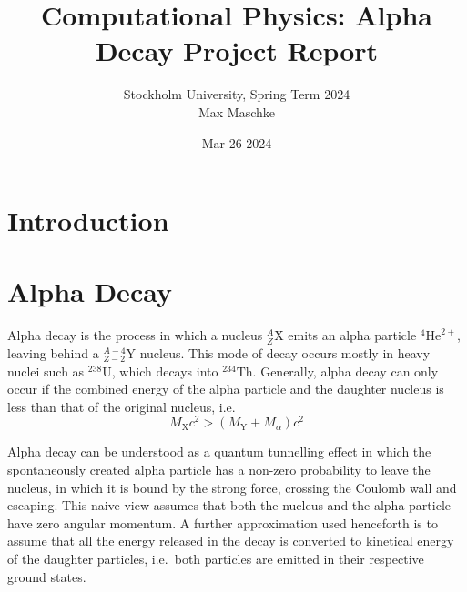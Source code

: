 \documentclass[a4paper,DIV=12,english]{scrartcl}
\title{Computational Physics: Alpha Decay Project Report}
\author{Stockholm University, Spring Term 2024 \\Max Maschke}
\date{Mar 26 2024}
\begin{document}
\maketitle


\tableofcontents
\newpage


\newpage
\section{Introduction}

\section{Alpha Decay}
Alpha decay is the process in which a nucleus $^A_Z \text{X}$ emits an alpha particle $^4\text{He}^{2+}$, leaving behind a $^{A-4}_{Z-2}\text{Y}$ nucleus. This mode of decay occurs mostly in heavy nuclei such as $^{238} \text{U}$, which decays into $^{234}\text{Th}$. Generally, alpha decay can only occur if the combined energy of the alpha particle and the daughter nucleus is less than that of the original nucleus, i.e.
\begin{equation}
    M_\text{X} c^2 > (M_\text{Y} + M_\alpha)c^2
\end{equation}

Alpha decay can be understood as a quantum tunnelling effect in which the spontaneously created alpha particle has a non-zero probability to leave the nucleus, in which it is bound by the strong force, crossing the Coulomb wall and escaping. This naive view assumes that both the nucleus and the alpha particle have zero angular momentum. A further approximation used henceforth is to assume that all the energy released in the decay is converted to kinetical energy of the daughter particles, i.e.\ both particles are emitted in their respective ground states.
\end{document}
